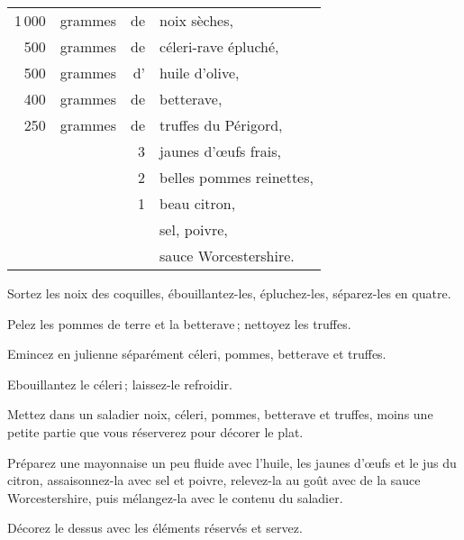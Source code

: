 \footnotesize
\begin{longtable}{rrrp{16em}}
  1 000 & grammes & de & noix sèches,                                                                     \\
    500 & grammes & de & céleri-rave épluché,                                                             \\
    500 & grammes & d’ & huile d'olive,                                                                   \\
    400 & grammes & de & betterave,                                                                       \\
    250 & grammes & de & truffes du Périgord,                                                             \\
        &         &  3 & jaunes d'œufs frais,                                                             \\
        &         &  2 & belles pommes reinettes,                                                         \\
        &         &  1 & beau citron,                                                                     \\
        &         &    & sel, poivre,                                                                     \\
        &         &    & sauce Worcestershire.                                                            \\
\end{longtable}
\normalsize

Sortez les noix des coquilles, ébouillantez-les, épluchez-les, séparez-les en quatre.

Pelez les pommes de terre et la betterave ; nettoyez les truffes.

Emincez en julienne séparément céleri, pommes, betterave et truffes.

Ebouillantez le céleri ; laissez-le refroidir.

Mettez dans un saladier noix, céleri, pommes, betterave et truffes, moins une
petite partie que vous réserverez pour décorer le plat.

Préparez une mayonnaise un peu fluide avec l'huile, les jaunes d'œufs et le jus
du citron, assaisonnez-la avec sel et poivre, relevez-la au goût avec de la
sauce Worcestershire, puis mélangez-la avec le contenu du saladier.

Décorez le dessus avec les éléments réservés et servez.

